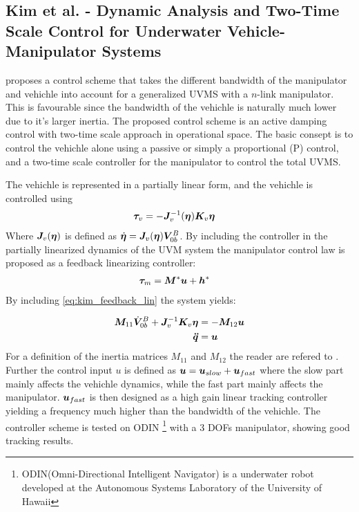 
\subsection{Kim et al. -  Dynamic Analysis and Two-Time Scale Control for
Underwater Vehicle-Manipulator Systems}

\cite{two_time_scale} proposes a control scheme that takes the different bandwidth of the manipulator and vehichle into account for a generalized UVMS with a $n$-link manipulator. This is favourable since the bandwidth of the vehichle is naturally much lower due to it's larger inertia. The proposed control scheme is an active damping control with two-time scale approach in operational space. The basic consept is to control the vehichle alone using a passive or simply a proportional (P) control, and a two-time scale controller for the manipulator to control the total UVMS. 

The vehichle is represented in a partially linear form, and the vehichle is controlled using
\begin{align}
  \boldsymbol \tau_v &= - \boldsymbol J_{v}^{-1}(\boldsymbol \eta)\boldsymbol K_v \boldsymbol \eta
  \label{eq:kimProp}
\end{align}
Where $\boldsymbol J_v(\boldsymbol \eta)$ is defined as $\dot{\boldsymbol \eta}=\boldsymbol J_v(\boldsymbol \eta)\boldsymbol V_{0b}^B $. By including the controller in the partially linearized dynamics of the UVM system the manipulator control law is proposed as a feedback linearizing controller:
\begin{align}
  \boldsymbol \tau_m &=\boldsymbol M^* \boldsymbol u+ \boldsymbol h^*
  \label{eq:kim_feedback_lin}
\end{align}
By including \eqref{eq:kim_feedback_lin} the system yields:

\begin{align}
  \boldsymbol M_{11}  \dot{\boldsymbol V}_{0b}^B + \boldsymbol J_v^{-1} \boldsymbol K_v \boldsymbol \eta &= -\boldsymbol M_{12} \boldsymbol u
  \label{eq:kim_linearized} \\
  \boldsymbol{\ddot q} &=\boldsymbol u
  \label{eq_kim_linearized2}
\end{align}
For a definition of the inertia matrices $M_{11}$ and $M_{12}$ the reader are refered to \cite{two_time_scale}. Further the control input $u$ is defined as $\boldsymbol u = \boldsymbol u_{slow}+\boldsymbol u_{fast}$ where the slow part mainly affects the vehichle dynamics, while the fast part mainly affects the manipulator. $\boldsymbol u_{fast}$ is then designed as a high gain linear tracking controller yielding a frequency much higher than the bandwidth of the vehichle. The controller scheme is tested on ODIN \footnote{ODIN(Omni-Directional Intelligent Navigator) is a underwater robot developed at the Autonomous Systems Laboratory of the University of Hawaii} with a 3 DOFs manipulator, showing good tracking results.  


